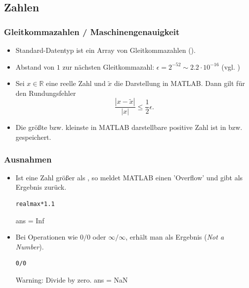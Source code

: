 \documentclass[hyperref={xetex}]{beamer}
\begin{document}
\subsection{Zahlen}
%
%
\begin{frame}[fragile]\frametitle{Gleitkommazahlen / Maschinengenauigkeit}
\begin{itemize}
\item Standard-Datentyp ist ein Array von Gleitkommazahlen ().
\item Abstand von $1$ zur nächsten Gleitkommazahl: $\epsilon
  = 2^{-52} \sim 2.2\cdot10^{-16}$ (vgl. )
\item Sei $x \in \mathbb{R}$ eine reelle Zahl und $\tilde x$ die
  Darstellung in MATLAB. Dann gilt für den Rundungsfehler \\[-0.5cm]
\[ \frac{|x - \tilde x|}{|x|}\leq \frac{1}{2} \epsilon .\]
\item Die größte bzw. kleinste in MATLAB darstellbare positive Zahl
  ist in
 bzw.  gespeichert. 
\end{itemize}
\end{frame}
%
%
\begin{frame}[fragile]\frametitle{Ausnahmen}
\begin{itemize}
\item Ist eine Zahl größer als , so meldet MATLAB einen
  'Overflow' und gibt als Ergebnis  zurück.
\begin{lstlisting}
realmax*1.1
\end{lstlisting}
\begin{matlab}
 ans =   Inf
\end{matlab}

\item Bei Operationen wie $0/0$  oder $\infty / \infty$, erhält man als Ergebnis
   ({\it Not a Number}).
\begin{lstlisting}
0/0 
\end{lstlisting}
\begin{matlab}
Warning: Divide by zero.
ans =   NaN 
\end{matlab}

\end{itemize}
\end{frame}
%
%
\end{document}
